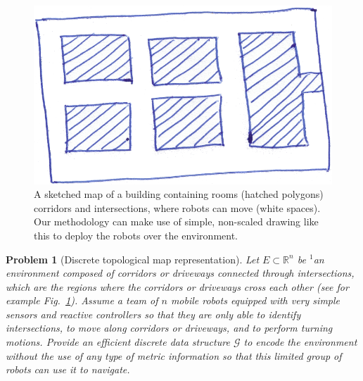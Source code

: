 \documentclass[smallcondensed]{svjour3}
\newtheorem{myprob}{Problem}
\begin{document}

\begin{figure}[t]
\centering
\includegraphics[width=0.7\columnwidth]{Figures/Fig3.png}
\caption{A sketched map of a building containing rooms (hatched polygons) corridors and intersections, where robots can move (white spaces). Our methodology can make use of simple, non-scaled drawing like this to deploy the robots over the environment.}
\label{fig:blockemap}
\end{figure}

\begin{myprob}[Discrete topological map representation]
\label{problem1}
%
\textnormal{
Let $E \subset \mathbb{R}^{n}$ be {\color{blue}$^1$an environment composed of corridors or driveways connected through intersections, which are the regions where the corridors or driveways cross each other (see for example Fig.~\ref{fig:blockemap})}. Assume a team of $n$ mobile robots equipped with very simple sensors and reactive controllers so that they are only able to identify intersections, to move along corridors or driveways, and to perform turning motions.  
\textit{Provide an efficient discrete data structure $\mathcal G$ to encode the environment without the use of any type of metric information so that this limited group of robots can use it to navigate.}
}
\end{myprob}
\end{document}
